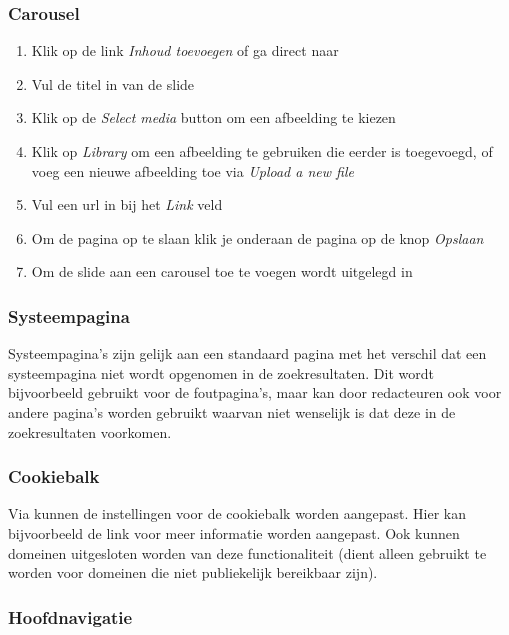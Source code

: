 \subsubsection{Carousel}
\begin{enumerate}
\item Klik op de link \emph{Inhoud toevoegen} of ga direct naar \
\item Vul de titel in van de slide
\item Klik op de \emph{Select media} button om een afbeelding te kiezen
\item Klik op \emph{Library} om een afbeelding te gebruiken die eerder is toegevoegd,  of voeg een nieuwe afbeelding toe via \emph{Upload a new file}
\item Vul een url in bij het \emph{Link} veld
\item Om de pagina op te slaan klik je onderaan de pagina op de knop \emph{Opslaan}
\item Om de slide aan een carousel toe te voegen wordt uitgelegd in 
\end{enumerate}

\subsubsection{Systeempagina}
Systeempagina's zijn gelijk aan een standaard pagina met het verschil dat een systeempagina niet wordt opgenomen in de zoekresultaten. Dit wordt bijvoorbeeld gebruikt voor de foutpagina's, maar kan door redacteuren ook voor andere pagina's worden gebruikt waarvan niet wenselijk is dat deze in de zoekresultaten voorkomen.

\subsubsection{Cookiebalk}
Via  kunnen de instellingen voor de cookiebalk worden aangepast. Hier kan bijvoorbeeld de link voor meer informatie worden aangepast. Ook kunnen domeinen uitgesloten worden van deze functionaliteit (dient alleen gebruikt te worden voor domeinen die niet publiekelijk bereikbaar zijn).

\subsubsection{Hoofdnavigatie}

